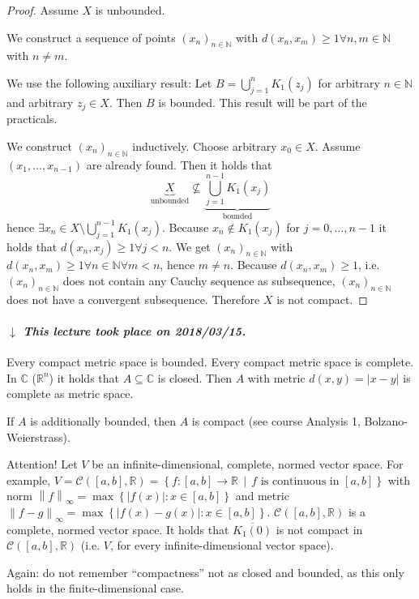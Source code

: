 \documentclass{article}
\newcommand{\set}[1]{\left\{#1\right\}}
\newcommand{\setdef}[2]{\left\{\left.#1\,\middle|\,#2\right.\right\}}
\newcommand{\norm}[1]{\left\|#1\right\|}
\newcommand{\card}[1]{\left|#1\right|}
\newcommand{\dateref}[1]{%
  \begin{mdframed}[backgroundcolor=gray!10,innerbottommargin=0pt,innertopmargin=0pt]
    \paragraph{\textit{$\downarrow$ This lecture took place on #1.}}%
  \end{mdframed}%
}
\begin{document}
\begin{proof}
  Assume $X$ is unbounded.

  We construct a sequence of points $(x_n)_{n \in \mathbb N}$ with $d(x_n, x_m) \geq 1 \forall n,m \in \mathbb N$ with $n \neq m$.

  We use the following auxiliary result: Let $B = \bigcup_{j=1}^n K_1(z_j)$ for arbitrary $n \in \mathbb N$ and arbitrary $z_j \in X$. Then $B$ is bounded. This result will be part of the practicals.

  We construct $(x_n)_{n\in\mathbb N}$ inductively. Choose arbitrary $x_0 \in X$. Assume $(x_1, \dots, x_{n-1})$ are already found. Then it holds that
  \[ \underbrace{X}_{\text{unbounded}} \not\subseteq \underbrace{\bigcup_{j=1}^{n-1} K_1(x_j)}_{\text{bounded}} \]
  hence $\exists x_n \in X \setminus \bigcup_{j=1}^{n-1} K_1(x_j)$.
  Because $x_n \not\in K_1(x_j)$ for $j = 0, \dots, n-1$ it holds that $d(x_n, x_j) \geq 1 \forall j < n$. We get $(x_n)_{n \in \mathbb N}$ with $d(x_n, x_m) \geq 1 \forall n \in \mathbb N \forall m < n$, hence $m \neq n$. Because $d(x_n, x_m) \geq 1$, i.e. $(x_n)_{n \in \mathbb N}$ does not contain any Cauchy sequence as subsequence, $(x_n)_{n \in \mathbb N}$ does not have a convergent subsequence. Therefore $X$ is not compact.
\end{proof}

\dateref{2018/03/15}

Every compact metric space is bounded. Every compact metric space is complete.
In $\mathbb C$ ($\mathbb R^n$) it holds that $A \subseteq \mathbb C$ is closed.
Then $A$ with metric $d(x,y) = \card{x - y}$ is complete as metric space.

If $A$ is additionally bounded, then $A$ is compact (see course Analysis 1, Bolzano-Weierstrass).

Attention! Let $V$ be an infinite-dimensional, complete, normed vector space.
For example, $V = \mathcal C([a,b], \mathbb R) = \setdef{f: [a,b] \to \mathbb R}{f \text{ is continuous in } [a,b]}$ with norm $\norm{f}_{\infty} = \max\set{\card{f(x)}: x \in [a,b]}$ and metric $\norm{f - g}_{\infty} = \max\set{\card{f(x) - g(x)}: x \in [a,b]}$. $\mathcal C([a,b], \mathbb R)$ is a complete, normed vector space.
It holds that $\overline{K_1(0)}$ is not compact in $\mathcal C([a,b], \mathbb R)$ (i.e. $V$, for every infinite-dimensional vector space).

Again: do not remember \enquote{compactness} not as closed and bounded, as this only holds in the finite-dimensional case.
\end{document}
